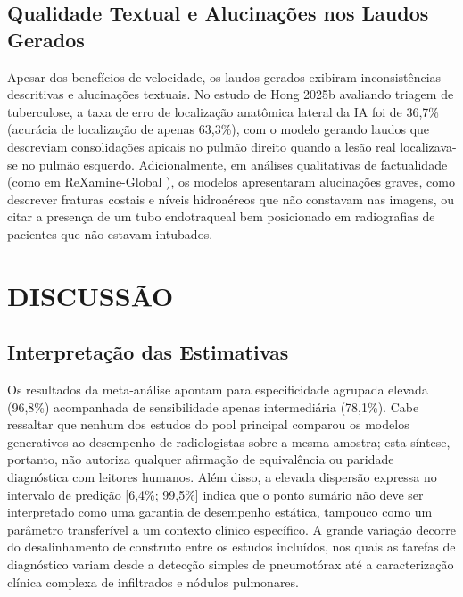 \documentclass[12pt,a4paper]{article}
\begin{document}
\subsection{Qualidade Textual e Alucinações nos Laudos Gerados}
Apesar dos benefícios de velocidade, os laudos gerados exibiram inconsistências descritivas e alucinações textuais. No estudo de Hong 2025b \cite{hong2025b} avaliando triagem de tuberculose, a taxa de erro de localização anatômica lateral da IA foi de 36,7\% (acurácia de localização de apenas 63,3\%), com o modelo gerando laudos que descreviam consolidações apicais no pulmão direito quando a lesão real localizava-se no pulmão esquerdo. Adicionalmente, em análises qualitativas de factualidade (como em ReXamine-Global \cite{banerjee}), os modelos apresentaram alucinações graves, como descrever fraturas costais e níveis hidroaéreos que não constavam nas imagens, ou citar a presença de um tubo endotraqueal bem posicionado em radiografias de pacientes que não estavam intubados.

\newpage
\section{DISCUSSÃO}

\subsection{Interpretação das Estimativas}
Os resultados da meta-análise apontam para especificidade agrupada elevada (96,8\%) acompanhada de sensibilidade apenas intermediária (78,1\%). Cabe ressaltar que nenhum dos estudos do pool principal comparou os modelos generativos ao desempenho de radiologistas sobre a mesma amostra; esta síntese, portanto, não autoriza qualquer afirmação de equivalência ou paridade diagnóstica com leitores humanos. Além disso, a elevada dispersão expressa no intervalo de predição [6,4\%; 99,5\%] indica que o ponto sumário não deve ser interpretado como uma garantia de desempenho estática, tampouco como um parâmetro transferível a um contexto clínico específico. A grande variação decorre do desalinhamento de construto entre os estudos incluídos, nos quais as tarefas de diagnóstico variam desde a detecção simples de pneumotórax até a caracterização clínica complexa de infiltrados e nódulos pulmonares.
\end{document}
